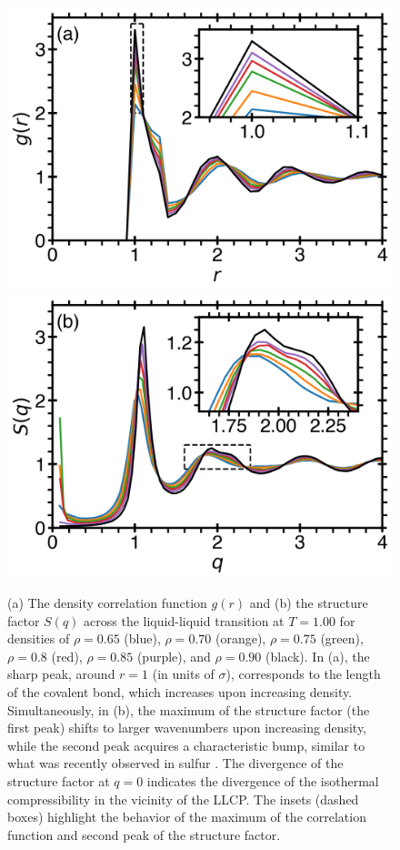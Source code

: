 \documentclass[9pt,twocolumn,twoside,lineno]{pnas-new}
\begin{document}
\begin{figure}[t]
\centering
{
\includegraphics[width=.9\linewidth]{Fig4a_gr.png}
\includegraphics[width=.9\linewidth]{Fig4b_sq.png}
}
\caption{(a) The density correlation function $g(r)$ and (b) the structure factor $S(q)$ across the liquid-liquid transition at $T=1.00$ for densities of $\rho=0.65$ (blue), $\rho=0.70$ (orange), $\rho=0.75$ (green), $\rho=0.8$ (red), $\rho=0.85$ (purple), and $\rho=0.90$ (black). In (a), the sharp peak, around $r=1$ (in units of $\sigma$), corresponds to the length of the covalent bond, which increases upon increasing density. Simultaneously, in (b), the maximum of the structure factor (the first peak) shifts to larger wavenumbers upon increasing density, while the second peak acquires a characteristic bump, similar to what was recently observed in sulfur \cite{Henry2020}. The divergence of the structure factor at $q=0$ indicates the divergence of the isothermal compressibility in the vicinity of the LLCP. The insets (dashed boxes) highlight the behavior of the maximum of the correlation function and second peak of the structure factor.}
\label{fig5}
\end{figure}
\end{document}
